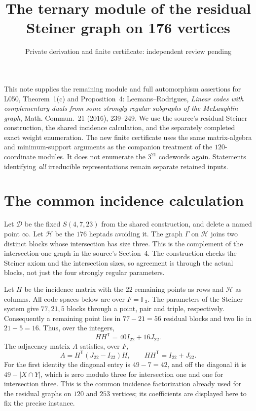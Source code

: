 \documentclass[11pt,a4paper]{article}
\title{The ternary module of the residual Steiner graph on 176 vertices}
\author{Private derivation and finite certificate: independent review pending}
\date{}
\begin{document}
\maketitle

This note supplies the remaining module and full automorphism assertions
for L050, Theorem~1(c) and Proposition~4: Leemans--Rodrigues,
\emph{Linear codes with complementary duals from some strongly regular
subgraphs of the McLaughlin graph}, Math. Commun.\ 21 (2016), 239--249.
We use the source's residual Steiner construction, the shared incidence
calculation, and the separately completed exact weight enumeration.
The new finite certificate uses the same matrix-algebra and minimum-support
arguments as the companion treatment of the $120$-coordinate modules.
It does not enumerate the $3^{21}$ codewords again. Statements identifying
\emph{all} irreducible representations remain separate retained inputs.

\section{The common incidence calculation}
Let $\mathcal D$ be the fixed $S(4,7,23)$ from the shared construction,
and delete a named point $\infty$.
Let $\mathcal H$ be the $176$ heptads avoiding it. The graph $\Gamma$ on
$\mathcal H$ joins two distinct blocks whose intersection has size three.
This is the complement of the intersection-one graph in the source's
Section~4. The construction checks the Steiner axiom and the intersection
sizes, so agreement is through the actual blocks, not just the four
strongly regular parameters.

Let $H$ be the incidence matrix with the $22$ remaining points as rows and
$\mathcal H$ as columns. All code spaces below are over $F=\mathbb F_3$.
The parameters of the Steiner system give $77,21,5$ blocks through a
point, pair and triple, respectively. Consequently a remaining point lies
in $77-21=56$ residual blocks and two lie in $21-5=16$.
Thus, over the integers,
\[
 HH^{\mathsf T}=40I_{22}+16J_{22}.
\]
The adjacency matrix $A$ satisfies, over $F$,
\[
 A=H^{\mathsf T}(J_{22}-I_{22})H,\qquad
 HH^{\mathsf T}=I_{22}+J_{22}.                         \tag{1}
\]
For the first identity the diagonal entry is $49-7=42$, and off the
diagonal it is $49-|X\cap Y|$, which is zero modulo three for intersection
one and one for intersection three. This is the common incidence
factorization already used for the residual graphs on $120$ and $253$
vertices; its coefficients are displayed here to fix the precise instance.
\end{document}
